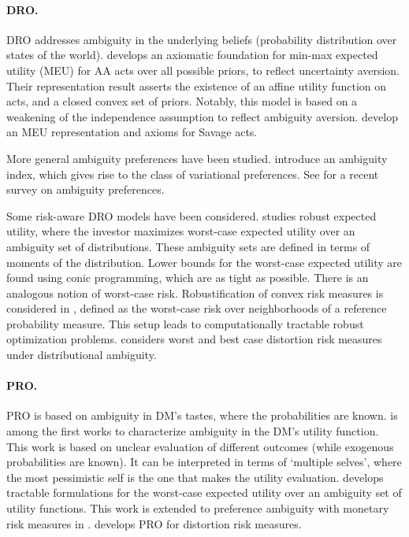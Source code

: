 \documentclass[11pt,oneside]{article}
\theoremstyle{plain}
\theoremstyle{plain}
\theoremstyle{plain}
\theoremstyle{plain}
\theoremstyle{plain}
\theoremstyle{definition}
\theoremstyle{definition}
\theoremstyle{remark}
\theoremstyle{plain}
\begin{document}
\paragraph{DRO.}
DRO addresses ambiguity in the underlying beliefs (probability distribution over states of the world).
\cite{gilboa1989maxmin} develops an axiomatic foundation for min-max expected utility (MEU) for AA acts over all possible priors, to reflect uncertainty aversion. Their representation result asserts the existence of an affine utility function on acts, and a closed convex set of priors.
Notably, this model is based on a weakening of the independence assumption to reflect ambiguity aversion.
\cite{casadesus2000maxmin} develop an MEU representation and axioms for Savage acts.

More general ambiguity preferences have been studied.
\cite{maccheroni2006ambiguity} introduce an ambiguity index, which gives rise to the class of variational preferences.
See \cite{gilboa2016ambiguity} for a recent survey on ambiguity preferences.

Some risk-aware DRO models have been considered. \cite{natarajan2010tractable} studies robust expected utility, where the investor maximizes worst-case expected utility over an ambiguity set of distributions. These ambiguity sets are defined in terms of moments of the distribution. Lower bounds for the worst-case expected utility are found using conic programming, which are as tight as possible.
There is an analogous notion of worst-case risk.
Robustification of convex risk measures is considered in \cite{wozabal2014robustifying}, defined as the worst-case risk over neighborhoods of a reference probability measure. This setup leads to computationally tractable robust optimization problems. \cite{bernard2023robust} considers worst and best case distortion risk measures under distributional ambiguity.

\paragraph{PRO.}
PRO is based on ambiguity in DM's tastes, where the probabilities are known.
\cite{maccheroni2002maxmin} is among the first works to characterize ambiguity in the DM's utility function. This work is based on unclear evaluation of different outcomes (while exogenous probabilities are known). It can be interpreted in terms of `multiple selves', where the most pessimistic self is the one that makes the utility evaluation.
\cite{armbruster2015decision} develops tractable formulations for the worst-case expected utility over an ambiguity set of utility functions. This work is extended to preference ambiguity with monetary risk measures in \cite{delage2018minimizing}. \cite{cai2023distributionally} develops PRO for distortion risk measures.
\end{document}
